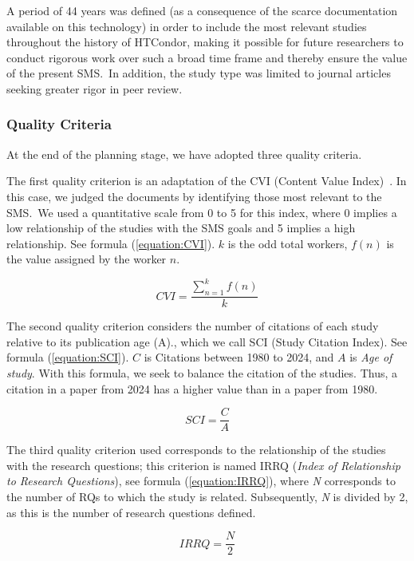 A period of 44 years was defined (as a consequence of the scarce documentation available on this technology) in order to include the most relevant studies throughout the history of HTCondor, making it possible for future researchers to conduct rigorous work over such a broad time frame and thereby ensure the value of the present SMS.~In addition, the study type was limited to journal articles seeking greater rigor in peer review.



\subsubsection{Quality Criteria}
At the end of the planning stage, we have adopted three quality criteria.

The first quality criterion is an adaptation of the CVI (Content Value Index)~\cite{Almanasreh2019214, yaghmaei2003content}. In this case, we judged the documents by identifying those most relevant to the SMS.~We used a quantitative scale from 0 to 5 for this index, where 0 implies a low relationship of the studies with the SMS goals and 5 implies a high relationship. See formula (\ref{equation:CVI}). $k$ is the odd total workers, $f(n)$ is the value assigned by the worker $n$.

\begin{equation}
	\label{equation:CVI}
	CVI = \frac{\sum_{n=1}^{k} f(n)}{k}
\end{equation}

The second quality criterion considers the number of citations of each study relative to its publication age (A)., which we call SCI (Study Citation Index). See  formula (\ref{equation:SCI}). $C$ is Citations between 1980 to 2024, and $A$ is \textit{Age of study}. With this formula, we seek to balance the citation of the studies. Thus, a citation in a  paper from 2024 has a higher value than in a paper from 1980.


\begin{equation}
	\label{equation:SCI}
	SCI = \frac{C}{A}
\end{equation}


\hbox{}
The third quality criterion used corresponds to the relationship of the studies with the research questions; this criterion is named IRRQ (\textit{Index of Relationship to Research Questions}), see formula (\ref{equation:IRRQ}), where \textit{N} corresponds to the number of RQs to which the study is related. Subsequently, \textit{N} is divided by 2, as this is the number of research questions defined.

\begin{equation}
	\label{equation:IRRQ}
	IRRQ = \frac{N}{2}
\end{equation}

